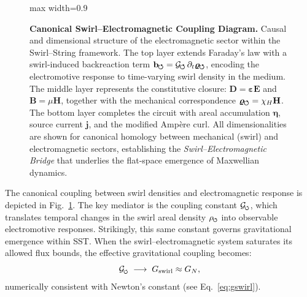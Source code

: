 \documentclass[10pt,reprint,aps,onecolumn,nofootinbib]{revtex4-2}
\newcommand{\swirlarrow}{%
    \mathchoice{\mkern-2mu\scriptstyle\boldsymbol{\circlearrowleft}}%
    {\mkern-2mu\scriptstyle\boldsymbol{\circlearrowleft}}%
    {\mkern-2mu\scriptstyle\boldsymbol{\circlearrowleft}}%
    {\mkern-2mu\scriptscriptstyle\boldsymbol{\circlearrowleft}}%
}
\begin{document}
\begin{figure}[htbp]
\begin{adjustbox}{max width=0.9\textwidth}
        \end{adjustbox}
        \caption{\textbf{Canonical Swirl–Electromagnetic Coupling Diagram.} Causal and dimensional structure of the electromagnetic sector within the Swirl–String framework. The top layer extends Faraday’s law with a swirl-induced backreaction term $\mathbf{b}_{\swirlarrow} = \mathcal{G}_{\swirlarrow} \,\partial_t \bm{\varrho}_{\swirlarrow}$, encoding the electromotive response to time-varying swirl density in the medium. The middle layer represents the constitutive closure: $\mathbf{D} = \bm{\varepsilon}\mathbf{E}$ and $\mathbf{B} = \mu\mathbf{H}$, together with the mechanical correspondence $\bm{\varrho}_{\swirlarrow} = \chi_H \mathbf{H}$. The bottom layer completes the circuit with areal accumulation $\bm{\eta}$, source current $\mathbf{j}$, and the modified Ampère curl. All dimensionalities are shown for canonical homology between mechanical (swirl) and electromagnetic sectors, establishing the \emph{Swirl–Electromagnetic Bridge} that underlies the flat-space emergence of Maxwellian dynamics.
        }
        \label{fig:swirl_em_causal}
        \end{figure}



            The canonical coupling between swirl densities and electromagnetic response is depicted in Fig.~\ref{fig:swirl_em_causal}. The key mediator is the coupling constant \( \mathcal{G}_{\mkern-2mu\scriptscriptstyle\boldsymbol{\circlearrowleft}} \), which translates temporal changes in the swirl areal density \( \rho_{\mkern-2mu\scriptscriptstyle\boldsymbol{\circlearrowleft}} \) into observable electromotive responses. Strikingly, this same constant governs gravitational emergence within SST. When the swirl–electromagnetic system saturates its allowed flux bounds, the effective gravitational coupling becomes:
            \[
                \mathcal{G}_{\mkern-2mu\scriptscriptstyle\boldsymbol{\circlearrowleft}} \;\longrightarrow\; G_{\mathrm{swirl}} \approx G_N,
            \]
            numerically consistent with Newton’s constant (see Eq.~\ref{eq:gswirl}).
\end{document}
